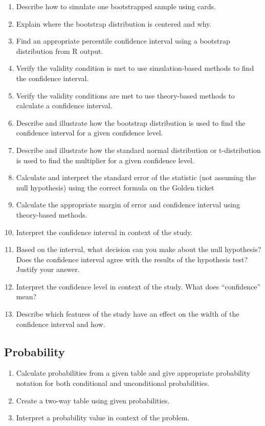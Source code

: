 \documentclass[
]{report}
\begin{document}
\begin{enumerate}
\def\labelenumi{\arabic{enumi}.}
\setcounter{enumi}{26}
\item
  Describe how to simulate one bootstrapped sample using cards.
\item
  Explain where the bootstrap distribution is centered and why.
\item
  Find an appropriate percentile confidence interval using a bootstrap distribution from R output.
\item
  Verify the validity condition is met to use simulation-based methods to find the confidence interval.
\item
  Verify the validity conditions are met to use theory-based methods to calculate a confidence interval.
\item
  Describe and illustrate how the bootstrap distribution is used to find the confidence interval for a given confidence level.
\item
  Describe and illustrate how the standard normal distribution or t-distribution is used to find the multiplier for a given confidence level.
\item
  Calculate and interpret the standard error of the statistic (not assuming the null hypothesis) using the correct formula on the Golden ticket
\item
  Calculate the appropriate margin of error and confidence interval using theory-based methods.
\item
  Interpret the confidence interval in context of the study.
\item
  Based on the interval, what decision can you make about the null hypothesis? Does the confidence interval agree with the results of the hypothesis test? Justify your answer.
\item
  Interpret the confidence level in context of the study. What does ``confidence'' mean?
\item
  Describe which features of the study have an effect on the width of the confidence interval and how.
\end{enumerate}

\subsection{Probability}\label{probability-1}

\begin{enumerate}
\def\labelenumi{\arabic{enumi}.}
\setcounter{enumi}{39}
\item
  Calculate probabilities from a given table and give appropriate probability notation for both conditional and unconditional probabilities.
\item
  Create a two-way table using given probabilities.
\item
  Interpret a probability value in context of the problem.
\end{enumerate}
\end{document}
